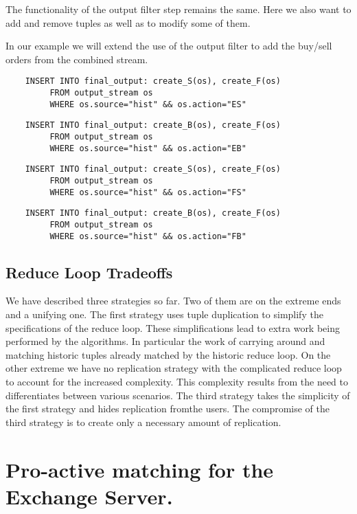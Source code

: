 \documentclass{article}
\begin{document}
The functionality of the output filter step remains the same. Here we also want to add and remove tuples as well as to modify some of them. 

In our example we will extend the use of the output filter to add the buy/sell orders from the combined stream. 

\begin{verbatim}
    INSERT INTO final_output: create_S(os), create_F(os)
         FROM output_stream os
         WHERE os.source="hist" && os.action="ES"
\end{verbatim}

\begin{verbatim}
    INSERT INTO final_output: create_B(os), create_F(os)
         FROM output_stream os
         WHERE os.source="hist" && os.action="EB"
\end{verbatim}

\begin{verbatim}
    INSERT INTO final_output: create_S(os), create_F(os)
         FROM output_stream os
         WHERE os.source="hist" && os.action="FS"
\end{verbatim}

\begin{verbatim}
    INSERT INTO final_output: create_B(os), create_F(os)
         FROM output_stream os
         WHERE os.source="hist" && os.action="FB"
\end{verbatim}

\subsection{Reduce Loop Tradeoffs}

We have described three strategies so far. Two of them are on the extreme ends and a unifying one. The first strategy uses tuple duplication to simplify the specifications of the reduce loop. These simplifications lead to extra work being performed by the algorithms. In particular the work of carrying around and matching historic tuples already matched by the historic reduce loop. On the other extreme we have no replication strategy with the complicated reduce loop to account for the increased complexity. This complexity results from the need to differentiates between various scenarios. The third strategy takes the simplicity of the first strategy and hides replication fromthe users. The compromise of the third strategy is to create only a necessary amount of replication. 

\section{Pro-active matching for the Exchange Server.}
\end{document}
